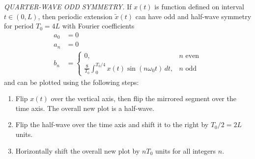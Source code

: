 \documentclass{report}
\begin{document}
\begin{tcolorbox}[width=\textwidth,colback={white}, sharp corners]
    \emph{QUARTER-WAVE ODD SYMMETRY.}
    If $x(t)$ is function defined on interval $t\in(0,L)$, then periodic extension $\tilde{x}(t)$ can have odd and half-wave symmetry for period $T_0=4L$ with 
    Fourier coefficients 
    \begin{align}
        a_0 &= 0 \\
        a_n &= 0 \\
        b_n &= 
        \begin{cases}
            0, & n \text{ even} \\
            \frac{8}{T_0}\int_{0}^{T_0/4} x(t)\sin(n\omega_0 t) \,dt, & n \text{ odd}
        \end{cases}
    \end{align}
    and can be plotted using the following steps:
    \begin{enumerate}
        \item Flip $x(t)$ over the vertical axis, then flip the mirrored segment over the time axis. The overall new plot is a half-wave.
        \item Flip the half-wave over the time axis and shift it to the right by $T_0/2 = 2L$ units.
        \item Horizontally shift the overall new plot by $nT_0$ units for all integers $n$.
    \end{enumerate}
\end{tcolorbox}
\end{document}
